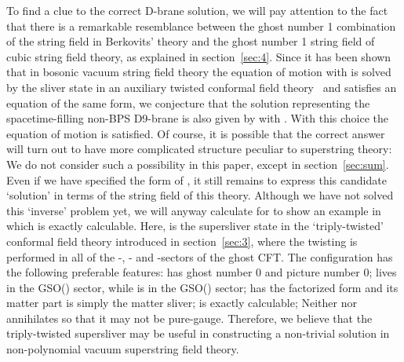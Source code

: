 \documentclass[a4paper,12pt]{article}
\providecommand{\cQ}{\mathcal{Q}}
\providecommand{\Qmid}{\cQ_{\mathrm{GRSZ}}}
\providecommand{\tp}{\prime\prime\prime}
\begin{document}
To find a clue to the correct D-brane solution, we will pay attention to the fact that there is a 
remarkable resemblance between the ghost number 1 combination \myHighlight{$A=e^{-\Phi}\cQ e^{\Phi}$}\coordHE{} of the 
string field \myHighlight{$\Phi$}\coordHE{} in Berkovits' theory and the ghost number 1 string field \myHighlight{$\Psi$}\coordHE{} of cubic 
string field theory, as explained in section~\ref{sec:4}. Since it has been shown that in bosonic 
vacuum string field theory the equation of motion \myHighlight{$\cQ\Psi+\Psi *\Psi=0$}\coordHE{} with \myHighlight{$\cQ=\Qmid$}\coordHE{} is 
solved by the sliver state \myHighlight{$\Xi^{\prime}$}\coordHE{} in an auxiliary twisted conformal field 
theory~\cite{GRSZ1,HK,Okuyama2,Okuda} and \coordHE{} satisfies an equation of the same form, we 
conjecture that the solution representing the spacetime-filling non-BPS D9-brane is also given by 
\coordHE{} with \myHighlight{$\cQ=\Qmid$}\coordHE{}. With this choice the equation of motion \coordHE{} is satisfied. 
Of course, it is possible that the correct answer will turn 
out to have more complicated structure peculiar to superstring theory: We do not consider such a 
possibility in this paper, except in section~\ref{sec:sum}. Even if we have specified the form of \coordHE{}, 
it still remains to express this 
candidate `solution' \coordHE{} in terms of the string field \myHighlight{$\Phi$}\coordHE{} of this theory. 
Although we have not solved this `inverse' problem yet, we will anyway calculate \myHighlight{$e^{-\widehat{\Phi}_0}
\widehat{\cQ}e^{\widehat{\Phi}_0}$}\coordHE{} for \myHighlight{$\widehat{\Phi}_0=a_-
\Xi^{\tp}\otimes\sigma_1$}\coordHE{} to show an example in which \myHighlight{$e^{-\widehat{\Phi}}\widehat{\cQ}e^{\widehat{\Phi}}$}\coordHE{} 
is exactly calculable. Here, \myHighlight{$\Xi^{\tp}$}\coordHE{} is the supersliver state in the 
`triply-twisted' conformal field theory introduced in section~\ref{sec:3}, where the twisting 
is performed in all of the \coordHE{}-, \myHighlight{$\phi$}\coordHE{}- and \myHighlight{$\eta\xi$}\coordHE{}-sectors of the ghost CFT. 
The configuration \coordHE{} has the following preferable features: \coordHE{} 
has ghost number 0 and picture number 0; \myHighlight{$\Xi^{\tp}$}\coordHE{} lives in the GSO(\myHighlight{$-$}\coordHE{}) sector, while \myHighlight{$\Xi$}\coordHE{} 
is in the GSO(\myHighlight{$+$}\coordHE{}) sector; \coordHE{} has the factorized form \coordHE{} and its matter part is simply the matter sliver; \coordHE{} 
is exactly calculable; Neither \coordHE{} nor \myHighlight{$\widehat{\cQ}$}\coordHE{} annihilates \coordHE{} 
so that it may not be pure-gauge. Therefore, we believe that the triply-twisted supersliver \myHighlight{$\Xi^{\tp}$}\coordHE{} 
may be useful in constructing a non-trivial solution in non-polynomial vacuum superstring field theory. 
\end{document}
